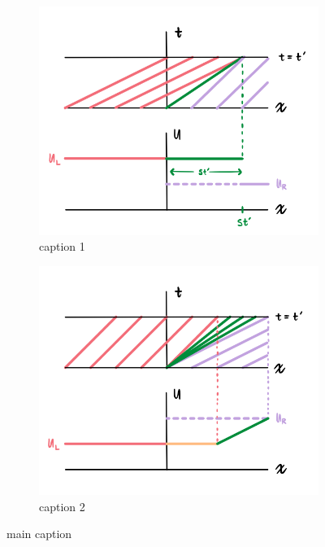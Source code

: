 \documentclass{myproject}
\begin{document}
\begin{figure}
    \centering
    \begin{subfigure}{.48\textwidth}
        \centering
        \includegraphics[width=1.0\textwidth]{riemann_shockwave.png}
        \caption{caption 1}
        \label{fig:shock}
    \end{subfigure}\hfill
    \begin{subfigure}{.48\textwidth}
        \centering
        \includegraphics[width=1\textwidth]{riemann_rarefaction.png}
        \caption{caption 2}
        \label{fig:rarefaction}
    \end{subfigure}
    \caption{main caption}
    \label{fig:riemann_discontinuities}
\end{figure}
\end{document}
